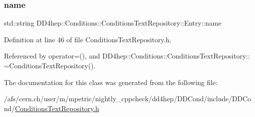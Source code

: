 \subsubsection{\texorpdfstring{name}{name}}
{\footnotesize\ttfamily std\+::string D\+D4hep\+::\+Conditions\+::\+Conditions\+Text\+Repository\+::\+Entry\+::name}



Definition at line 46 of file Conditions\+Text\+Repository.\+h.



Referenced by operator=(), and D\+D4hep\+::\+Conditions\+::\+Conditions\+Text\+Repository\+::$\sim$\+Conditions\+Text\+Repository().



The documentation for this class was generated from the following file\+:\begin{DoxyCompactItemize}
\item 
/afs/cern.\+ch/user/m/mpetric/nightly\+\_\+cppcheck/dd4hep/\+D\+D\+Cond/include/\+D\+D\+Cond/\hyperlink{_conditions_text_repository_8h}{Conditions\+Text\+Repository.\+h}\end{DoxyCompactItemize}

